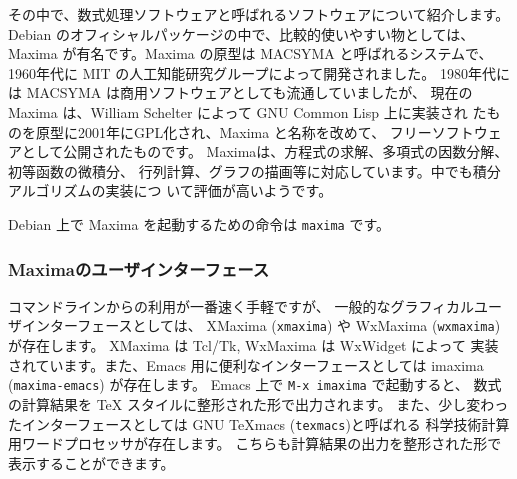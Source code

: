 \documentclass[mingoth,a4paper]{jsarticle}
\begin{document}
その中で、数式処理ソフトウェアと呼ばれるソフトウェアについて紹介します。
Debian のオフィシャルパッケージの中で、比較的使いやすい物としては、
Maxima が有名です。Maxima の原型は MACSYMA と呼ばれるシステムで、
1960年代に MIT の人工知能研究グループによって開発されました。
1980年代には MACSYMA は商用ソフトウェアとしても流通していましたが、
現在の Maxima は、William Schelter によって GNU Common Lisp 上に実装され
たものを原型に2001年にGPL化され、Maxima と名称を改めて、
フリーソフトウェアとして公開されたものです。
Maximaは、方程式の求解、多項式の因数分解、初等函数の微積分、
行列計算、グラフの描画等に対応しています。中でも積分アルゴリズムの実装につ
いて評価が高いようです。

Debian 上で Maxima を起動するための命令は {\tt maxima} です。

\subsubsection{Maximaのユーザインターフェース}
コマンドラインからの利用が一番速く手軽ですが、
一般的なグラフィカルユーザインターフェースとしては、
XMaxima ({\tt xmaxima}) や WxMaxima ({\tt wxmaxima}) が存在します。
XMaxima は Tcl/Tk, WxMaxima は WxWidget によって
実装されています。また、Emacs 用に便利なインターフェースとしては
imaxima ({\tt maxima-emacs}) が存在します。
Emacs 上で {\tt M-x imaxima} で起動すると、
数式の計算結果を \TeX{} スタイルに整形された形で出力されます。
また、少し変わったインターフェースとしては GNU TeXmacs ({\tt texmacs})と呼ばれる
科学技術計算用ワードプロセッサが存在します。
こちらも計算結果の出力を整形された形で表示することができます。
\end{document}
